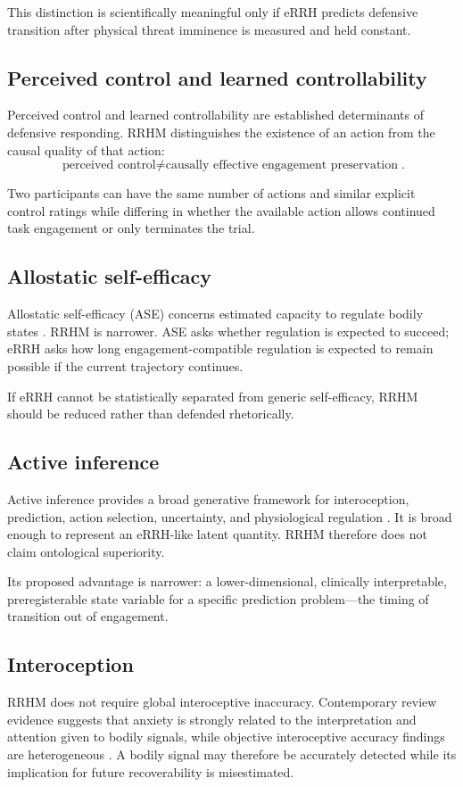 \documentclass[11pt]{article}
\begin{document}
This distinction is scientifically meaningful only if eRRH predicts defensive transition after physical threat imminence is measured and held constant.

\subsection{Perceived control and learned controllability}
Perceived control and learned controllability are established determinants of defensive responding. RRHM distinguishes the existence of an action from the causal quality of that action:
\[
\boxed{\text{perceived control}\neq\text{causally effective engagement preservation}}.
\]

Two participants can have the same number of actions and similar explicit control ratings while differing in whether the available action allows continued task engagement or only terminates the trial.

\subsection{Allostatic self-efficacy}
Allostatic self-efficacy (ASE) concerns estimated capacity to regulate bodily states \cite{stephan2016,hess2024}. RRHM is narrower. ASE asks whether regulation is expected to succeed; eRRH asks how long engagement-compatible regulation is expected to remain possible if the current trajectory continues.

If eRRH cannot be statistically separated from generic self-efficacy, RRHM should be reduced rather than defended rhetorically.

\subsection{Active inference}
Active inference provides a broad generative framework for interoception, prediction, action selection, uncertainty, and physiological regulation \cite{paulus2019}. It is broad enough to represent an eRRH-like latent quantity. RRHM therefore does not claim ontological superiority.

Its proposed advantage is narrower: a lower-dimensional, clinically interpretable, preregisterable state variable for a specific prediction problem---the timing of transition out of engagement.

\subsection{Interoception}
RRHM does not require global interoceptive inaccuracy. Contemporary review evidence suggests that anxiety is strongly related to the interpretation and attention given to bodily signals, while objective interoceptive accuracy findings are heterogeneous \cite{jenkinson2024,clemente2024}. A bodily signal may therefore be accurately detected while its implication for future recoverability is misestimated.
\end{document}
